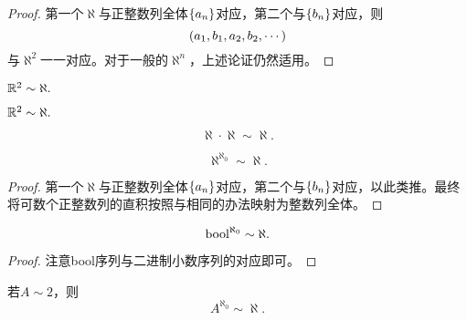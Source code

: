 \documentclass{ctexrep}
\begin{document}
  \begin{proof}
    第一个$\aleph$与正整数列全体$\left\{a_n\right\}$对应，第二个与$\left\{b_n\right\}$对应，则
    \[ \left(a_1,b_1,a_2,b_2,\cdots\right) \]
    与$\aleph^2$一一对应。对于一般的$\aleph^n$，上述论证仍然适用。
  \end{proof}
  \begin{collary}
    $\mathbb{R}^2\sim\aleph.$
  \end{collary}
  \begin{collary}
    $\mathbb{R}^2\sim\aleph.$
  \end{collary}
  \begin{collary}
    \[ \aleph \cdot \aleph \sim \aleph. \]
  \end{collary}
  \begin{theorem}
    \[ \aleph^{\aleph_0} \sim \aleph. \]
  \end{theorem}
  \begin{proof}
    第一个$\aleph$与正整数列全体$\left\{a_n\right\}$对应，第二个与$\left\{b_n\right\}$对应，以此类推。最终将可数个正整数列的直积按照与相同的办法映射为整数列全体。
  \end{proof}
  \begin{theorem}
    \[ \mathrm{bool}^{\aleph_0}\sim\aleph. \]
  \end{theorem}
  \begin{proof}
    注意bool序列与二进制小数序列的对应即可。
  \end{proof}
  \begin{collary}
    \label{coll:2n}
    若$A\sim 2$，则
    \[ A^{\aleph_0}\sim\aleph. \]
  \end{collary}
\end{document}
